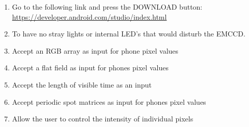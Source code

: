\documentclass{article}
\begin{document}
\begin{enumerate}
	\item Go to the following link and press the DOWNLOAD button: \url{https://developer.android.com/studio/index.html}
	\item To have no stray lights or internal LED’s that would disturb the EMCCD. 
	\item Accept an RGB array as input for phone pixel values
	\item Accept a flat field as input for phones pixel values
	\item Accept the length of visible time as an input
	\item Accept periodic spot matrices as input for phones pixel values
	\item Allow the user to control the intensity of individual pixels
\end{enumerate}
\end{document}
